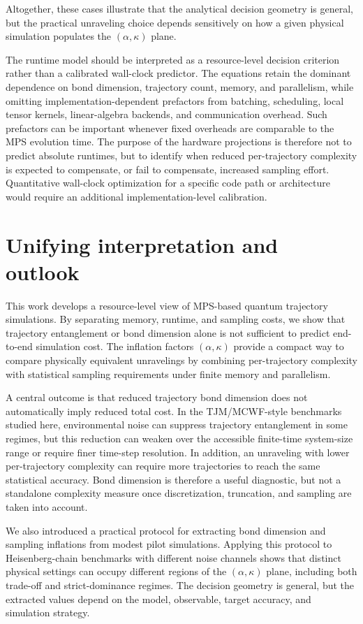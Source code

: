 \documentclass[aps, pra, superscriptaddress, reprint, floatfix]{revtex4-2}
\theoremstyle{plain}
\begin{document}
Altogether, these cases illustrate that the analytical decision geometry is general, but the practical unraveling choice depends sensitively on how a 
given physical simulation populates the $(\alpha,\kappa)$ plane.

The runtime model should be interpreted as a resource-level decision criterion rather than a calibrated wall-clock predictor. The equations retain the dominant dependence on bond dimension, trajectory count, memory, and parallelism, while omitting implementation-dependent prefactors from batching, scheduling, local tensor kernels, linear-algebra backends, and communication overhead. Such prefactors can be important whenever fixed overheads are comparable to the MPS evolution time. The purpose of the hardware projections is therefore not to predict absolute runtimes, but to identify when reduced per-trajectory complexity is expected to compensate, or fail to compensate, increased sampling effort. Quantitative wall-clock optimization for a specific code path or architecture would require an additional implementation-level calibration.


\section{Unifying interpretation and outlook}
This work develops a resource-level view of MPS-based quantum trajectory simulations. By separating memory, runtime, and sampling costs, we show that trajectory entanglement or bond dimension alone is not sufficient to predict end-to-end simulation cost. The inflation factors $(\alpha,\kappa)$ provide a compact way to compare physically equivalent unravelings by combining per-trajectory complexity with statistical sampling requirements under finite memory and parallelism.

A central outcome is that reduced trajectory bond dimension does not automatically imply reduced total cost. In the TJM/MCWF-style benchmarks studied here, environmental noise can suppress trajectory entanglement in some regimes, but this reduction can weaken over the accessible finite-time system-size range or require finer time-step resolution. In addition, an unraveling with lower per-trajectory complexity can require more trajectories to reach the same statistical accuracy. Bond dimension is therefore a useful diagnostic, but not a standalone complexity measure once discretization, truncation, and sampling are taken into account.

We also introduced a practical protocol for extracting bond dimension and sampling inflations from modest pilot simulations. Applying this protocol to Heisenberg-chain benchmarks with different noise channels shows that distinct physical settings can occupy different regions of the $(\alpha,\kappa)$ plane, including both trade-off and strict-dominance regimes. The decision geometry is general, but the extracted values depend on the model, observable, target accuracy, and simulation strategy.
\end{document}

